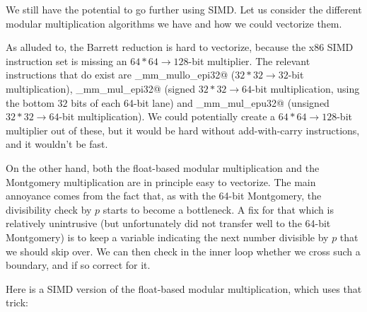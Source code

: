 We still have the potential to go further using SIMD.
Let us consider the different modular multiplication algorithms we have and how we could vectorize them.

As alluded to, the Barrett reduction is hard to vectorize, because the x86 SIMD instruction set is missing an \mbox{$64*64\rightarrow128$}-bit multiplier.
The relevant instructions that do exist are \verb@_mm_mullo_epi32@ (\mbox{$32*32\rightarrow32$}-bit multiplication), \verb@_mm_mul_epi32@ (signed \mbox{$32*32\rightarrow64$}-bit multiplication, using the bottom $32$ bits of each 64-bit lane) and \verb@_mm_mul_epu32@ (unsigned \mbox{$32*32\rightarrow64$}-bit multiplication).
We could potentially create a \mbox{$64*64\rightarrow128$}-bit multiplier out of these, but it would be hard without add-with-carry instructions, and it wouldn't be fast.

On the other hand, both the float-based modular multiplication and the Montgomery multiplication are in principle easy to vectorize.
The main annoyance comes from the fact that, as with the 64-bit Montgomery, the divisibility check by $p$ starts to become a bottleneck.
A fix for that which is relatively unintrusive (but unfortunately did not transfer well to the 64-bit Montgomery) is to keep a variable indicating the next number divisible by $p$ that we should skip over.
We can then check in the inner loop whether we cross such a boundary, and if so correct for it.

Here is a SIMD version of the float-based modular multiplication, which uses that trick:

